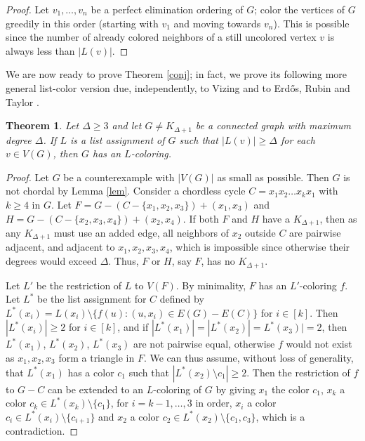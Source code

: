 \documentclass[11pt]{article}
\newtheorem{theorem}{Theorem}
\theoremstyle{definition}
\begin{document}
\begin{proof}
Let  $v_1, \dots, v_n$ be a perfect elimination ordering of $G$; color the vertices of $G$ greedily in this order (starting with $v_1$ and moving towards $v_n$). This is possible since the number of already colored neighbors of a still uncolored vertex $v$ is always less than $|L(v)|$. 
\end{proof}

We are now ready to prove Theorem \ref{conj}; in fact, we prove its following more general list-color version due, independently, to Vizing \cite{vizing} and to Erd\H{o}s, Rubin and Taylor \cite{erdos}. 


\begin{theorem}
Let $\Delta \geq 3$ and let $G \not= K_{\Delta+1}$ be a connected graph with maximum degree $\Delta$. If $L$ is a list assignment of $G$ such that $|L(v)| \geq \Delta$ for each $v \in V(G)$, then $G$ has an $L$-coloring. 
\end{theorem}

 
 
 \begin{proof}
Let $G$ be a counterexample with $|V(G)|$ as small as possible. Then $G$ is not chordal by Lemma \ref{lem}. Consider a chordless cycle $C = x_1x_2 \dots x_kx_1$ with $k \geq 4$ in $G$. Let $F = G - (C -  \{x_1, x_2, x_3\}) + (x_1, x_3)$ and $H = G - (C - \{x_2, x_3, x_4\}) + (x_2, x_{4})$.  If both $F$ and $H$ have a $K_{\Delta + 1}$, then as any $K_{\Delta+1}$ must use an added edge, all neighbors of $x_2$ outside $C$ are pairwise adjacent, and adjacent to $x_1, x_2, x_3, x_4$, which is impossible since otherwise their degrees would exceed $\Delta$. Thus, $F$ or $H$, say $F$, has no $K_{\Delta +1}$. 

Let $L'$ be the restriction of $L$ to $V(F)$. By minimality, $F$ has an $L'$-coloring $f$. Let $L^*$ be the list assignment for $C$ defined by $L^*(x_i) = L(x_i) \setminus \{f(u): (u, x_i) \in E(G) - E(C)\}$ for $i \in [k]$. Then $|L^*(x_i)| \geq 2$ for $i \in [k]$, and if $|L^*(x_1)| = |L^*(x_2)| = L^*(x_3)| = 2$, then $L^*(x_1)$, $L^*(x_2)$, $L^*(x_3)$ are not pairwise equal, otherwise $f$ would not exist as $x_1, x_2, x_3$ form a triangle in $F$. We can thus assume, without loss of generality, that $L^*(x_1)$ has a color $c_1$ such that $|L^*(x_2) \setminus c_1| \geq 2$. Then the restriction of $f$ to $G - C$ can be extended to an $L$-coloring of $G$ by giving $x_1$ the color $c_1$, $x_k$ a color $c_k \in L^*(x_k) \setminus \{c_1\}$, for $i = k-1, \dots, 3$ in order, $x_{i}$ a color $c_i \in L^*(x_i) \setminus \{c_{i+1}\}$ and $x_2$ a color $c_2 \in L^*(x_2) \setminus \{c_1, c_3\}$, which is a contradiction. \end{proof}
\end{document}
